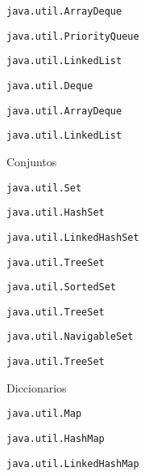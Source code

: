 \begin{longenum}
\begin{longenum}
\begin{longenum}
            \begin{longenum}
                \item \texttt{java.util.ArrayDeque}
                \item \texttt{java.util.PriorityQueue}
                \item \texttt{java.util.LinkedList}
            \end{longenum}
            \item \texttt{java.util.Deque}
            \begin{longenum}
                \item \texttt{java.util.ArrayDeque}
                \item \texttt{java.util.LinkedList}
            \end{longenum}
        \end{longenum}
        \item Conjuntos
        \begin{longenum}
            \item \texttt{java.util.Set}
            \begin{longenum}
                \item \texttt{java.util.HashSet}
                \item \texttt{java.util.LinkedHashSet}
                \item \texttt{java.util.TreeSet}
            \end{longenum}
            \item \texttt{java.util.SortedSet}
            \begin{longenum}
                \item \texttt{java.util.TreeSet}
            \end{longenum}
            \item \texttt{java.util.NavigableSet}
            \begin{longenum}
                \item \texttt{java.util.TreeSet}
            \end{longenum}
        \end{longenum}
        \item Diccionarios
        \begin{longenum}
            \item \texttt{java.util.Map}
            \begin{longenum}
                \item \texttt{java.util.HashMap}
                \item \texttt{java.util.LinkedHashMap}

\end{longenum}
\end{longenum}
\end{longenum}
\end{longenum}
